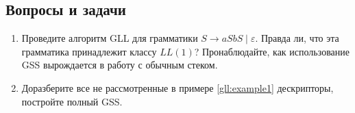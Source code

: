 \subsection{Вопросы и задачи}
\begin{enumerate}
  \item Проведите алгоритм GLL для грамматики $ S \to a S b S \mid \varepsilon$. Правда ли, что эта грамматика принадлежит классу $ LL(1) $? Пронаблюдайте, как использование GSS вырождается в работу с обычным стеком. 
  \item Доразберите все не рассмотренные в примере \ref{gll:example1} дескрипторы, постройте полный GSS.
\end{enumerate}
